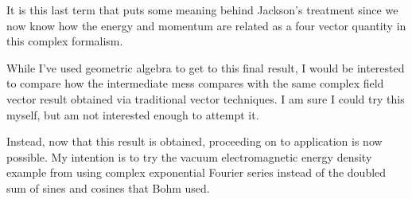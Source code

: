 It is this last term that puts some meaning behind Jackson's treatment since we now know how the energy and momentum are related as a four vector quantity in this complex formalism.  

While I've used geometric algebra to get to this final result, I would be interested to compare how the intermediate mess compares with the same complex field vector result obtained via traditional vector techniques.  I am sure I could try this myself, but am not interested enough to attempt it.

Instead, now that this result is obtained, proceeding on to application is now possible.  My intention is to try the vacuum electromagnetic energy density example from \cite{bohm1989qt} using complex exponential Fourier series instead of the doubled sum of sines and cosines that Bohm used.

\EndArticle
